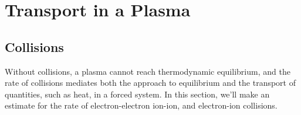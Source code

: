\chapter{Transport in a Plasma}\label{ch.plasma-transport}

\section{Collisions}\label{s.plasma-collisions}

Without collisions, a plasma cannot reach thermodynamic equilibrium, and the rate of collisions mediates both the approach to equilibrium and the transport of quantities, such as heat, in a forced system. In this section, we'll make an estimate for the rate of electron-electron ion-ion, and electron-ion collisions.


